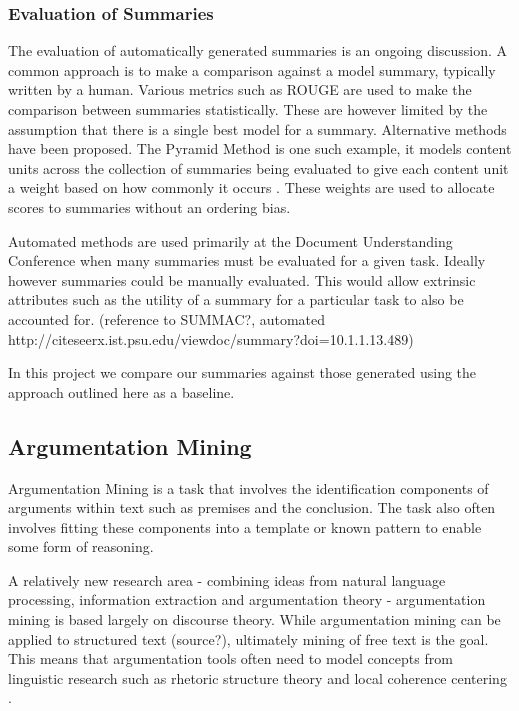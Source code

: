       \subsubsection{Evaluation of Summaries}
        The evaluation of automatically generated summaries is an ongoing discussion. A common approach is to make a comparison against a model summary, typically written by a human. Various metrics such as ROUGE \cite{lin2004rouge} are used to make the comparison between summaries statistically. These are however limited by the assumption that there is a single best model for a summary. Alternative methods have been proposed. The Pyramid Method is one such example, it models content units across the collection of summaries being evaluated to give each content unit a weight based on how commonly it occurs \cite{nenkova2004evaluating}. These weights are used to allocate scores to summaries without an ordering bias.

        Automated methods are used primarily at the Document Understanding Conference when many summaries must be evaluated for a given task. Ideally however summaries could be manually evaluated. This would allow extrinsic attributes such as the utility of a summary for a particular task to also be accounted for. (reference to SUMMAC?, automated http://citeseerx.ist.psu.edu/viewdoc/summary?doi=10.1.1.13.489)

        In this project we compare our summaries against those generated using the approach outlined here \cite{nenkova2006compositional} as a baseline.

    \subsection{Argumentation Mining}
      Argumentation Mining is a task that involves the identification components of arguments within text such as premises and the conclusion. The task also often involves fitting these components into a template or known pattern to enable some form of reasoning. \cite{palau2009argumentation}

      A relatively new research area - combining ideas from natural language processing, information extraction and argumentation theory - argumentation mining is based largely on discourse  theory. While argumentation mining can be applied to structured text (source?), ultimately mining of free text is the goal. This means that argumentation tools often need to model concepts from linguistic research such as rhetoric structure theory \cite{mann1988rhetorical} and local coherence centering \cite{weinstein21centering}.

